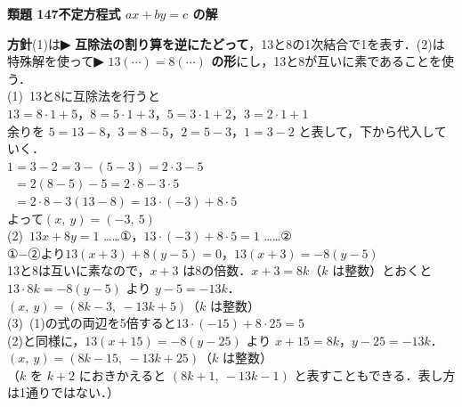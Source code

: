 \documentclass[a4paper,11pt]{ltjsarticle}
\newcommand{\ans}[2]{\Needspace{5\baselineskip}\vspace{6pt}%
  {\sffamily\bfseries 類題 #1\quad #2}\par}
\newcommand{\point}[1]{\textsf{\bfseries ▶ #1}}
\begin{document}
\ans{147}{不定方程式 $ax+by=c$ の解}
\begin{kai}
\textbf{方針}\quad (1)は\point{互除法の割り算を逆にたどって}，13と8の1次結合で1を表す．(2)は特殊解を使って\point{$13(\cdots)=8(\cdots)$ の形}にし，13と8が互いに素であることを使う．\\[2pt]
(1)\ 13と8に互除法を行うと\\
\hspace*{1.5em}$13=8\cdot1+5$，\quad $8=5\cdot1+3$，\quad $5=3\cdot1+2$，\quad $3=2\cdot1+1$\\
\hspace*{1.5em}余りを $5=13-8$，$3=8-5$，$2=5-3$，$1=3-2$ と表して，下から代入していく．\\
\hspace*{1.5em}$1=3-2=3-(5-3)=2\cdot3-5$\\
\hspace*{1.5em}$\phantom{1}=2(8-5)-5=2\cdot8-3\cdot5$\\
\hspace*{1.5em}$\phantom{1}=2\cdot8-3(13-8)=13\cdot(-3)+8\cdot5$\\
\hspace*{1.5em}よって\quad $(x,\ y)=(-3,\ 5)$\\[2pt]
(2)\ $13x+8y=1$ ……①，\quad $13\cdot(-3)+8\cdot5=1$ ……②\\
\hspace*{1.5em}①$-$②より\quad $13(x+3)+8(y-5)=0$，\quad $13(x+3)=-8(y-5)$\\
\hspace*{1.5em}13と8は互いに素なので，$x+3$ は8の倍数．$x+3=8k$（$k$ は整数）とおくと\\
\hspace*{1.5em}$13\cdot8k=-8(y-5)$ より $y-5=-13k$．\\
\hspace*{1.5em}$(x,\ y)=(8k-3,\ -13k+5)$\quad （$k$ は整数）\\[2pt]
(3)\ (1)の式の両辺を5倍すると\quad $13\cdot(-15)+8\cdot25=5$\\
\hspace*{1.5em}(2)と同様に，$13(x+15)=-8(y-25)$ より $x+15=8k$，$y-25=-13k$．\\
\hspace*{1.5em}$(x,\ y)=(8k-15,\ -13k+25)$\quad （$k$ は整数）\\
\hspace*{1.5em}（$k$ を $k+2$ におきかえると $(8k+1,\ -13k-1)$ と表すこともできる．表し方は1通りではない．）
\end{kai}
\end{document}
